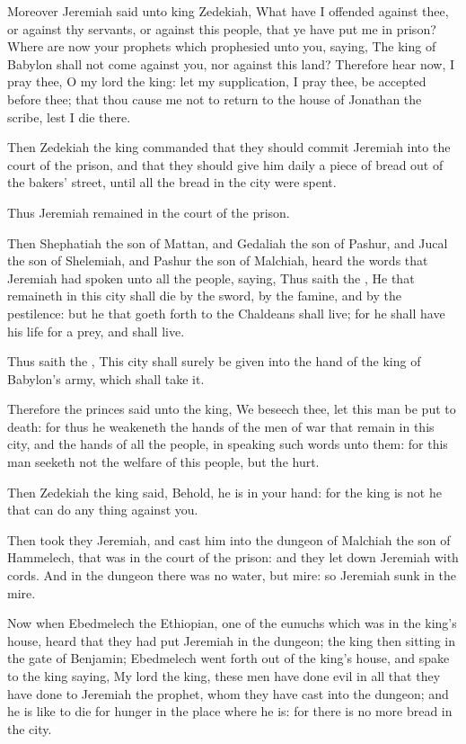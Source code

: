 \Verse Moreover Jeremiah said unto king Zedekiah, What have I offended against thee, or against thy servants, or against this people, that ye have put me in prison?  \Verse Where are now your prophets which prophesied unto you, saying, The king of Babylon shall not come against you, nor against this land?  \Verse Therefore hear now, I pray thee, O my lord the king: let my supplication, I pray thee, be accepted before thee; that thou cause me not to return to the house of Jonathan the scribe, lest I die there.

\Verse Then Zedekiah the king commanded that they should commit Jeremiah into the court of the prison, and that they should give him daily a piece of bread out of the bakers' street, until all the bread in the city were spent.

Thus Jeremiah remained in the court of the prison.


\Chapter
\Verse Then Shephatiah the son of Mattan, and Gedaliah the son of Pashur, and Jucal the son of Shelemiah, and Pashur the son of Malchiah, heard the words that Jeremiah had spoken unto all the people, saying, \Verse Thus saith the \LORD, He that remaineth in this city shall die by the sword, by the famine, and by the pestilence: but he that goeth forth to the Chaldeans shall live; for he shall have his life for a prey, and shall live.

\Verse Thus saith the \LORD, This city shall surely be given into the hand of the king of Babylon's army, which shall take it.

\Verse Therefore the princes said unto the king, We beseech thee, let this man be put to death: for thus he weakeneth the hands of the men of war that remain in this city, and the hands of all the people, in speaking such words unto them: for this man seeketh not the welfare of this people, but the hurt.

\Verse Then Zedekiah the king said, Behold, he is in your hand: for the king is not he that can do any thing against you.

\Verse Then took they Jeremiah, and cast him into the dungeon of Malchiah the son of Hammelech, that was in the court of the prison: and they let down Jeremiah with cords. And in the dungeon there was no water, but mire: so Jeremiah sunk in the mire.

\Verse Now when Ebedmelech the Ethiopian, one of the eunuchs which was in the king's house, heard that they had put Jeremiah in the dungeon; the king then sitting in the gate of Benjamin; \Verse Ebedmelech went forth out of the king's house, and spake to the king saying, \Verse My lord the king, these men have done evil in all that they have done to Jeremiah the prophet, whom they have cast into the dungeon; and he is like to die for hunger in the place where he is: for there is no more bread in the city.

